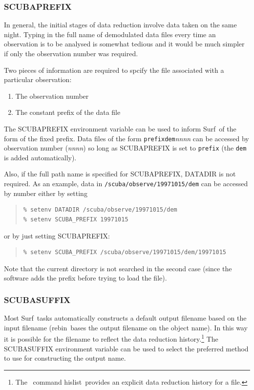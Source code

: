 \documentclass[twoside,11pt]{article}
\newcommand{\scusoft}          {{\sc Surf}}
\newcommand{\Kappa}{\xref{{\sc{Kappa}}}{sun95}{}}
\newcommand{\task}[1]{{\sf #1}}
\newcommand{\rebin}{\htmlref{\task{rebin}}{REBIN}}
\newcommand{\hislist}{\xref{\task{hislist}}{sun95}{HISLIST}}
\newenvironment{myquote}{\begin{quote}\begin{small}}{\end{small}\end{quote}}
\newcommand{\htmlref}[2]{#1}
\newcommand{\xref}[3]{#1}
\renewcommand{\_}{\texttt{\symbol{95}}}
\begin{document}
\subsubsection{SCUBA\_PREFIX}

In general, the initial stages of data reduction involve data taken on the
same night. Typing in the full name of demodulated data files every time an
observation is to be analysed is somewhat tedious and it would be much simpler 
if only the observation number was required.

Two pieces of information are required to spcify the file associated with a
particular observation:
\begin{enumerate}
\item The observation number
\item The constant prefix of the data file
\end{enumerate}

The SCUBA\_PREFIX environment variable can be used to inform \scusoft\
of the form of the fixed prefix. Data files of the form
\texttt{prefix\_dem\_}\textit{nnnn} can be accessed by observation number
(\textit{nnnn}) so long as SCUBA\_PREFIX is set to \texttt{prefix} (the
\texttt{\_dem\_} is added automatically).

Also, if the full path name is specified for SCUBA\_PREFIX, DATADIR is not
required. As an example, data in \texttt{/scuba/observe/19971015/dem}
can be accessed by number either by setting
\begin{myquote}
\begin{verbatim}
% setenv DATADIR /scuba/observe/19971015/dem
% setenv SCUBA_PREFIX 19971015
\end{verbatim}
\end{myquote}
or by just setting SCUBA\_PREFIX:
\begin{myquote}
\begin{verbatim}
% setenv SCUBA_PREFIX /scuba/observe/19971015/dem/19971015
\end{verbatim}
\end{myquote}
Note that the current directory is not searched in the second case (since the
software adds the prefix before trying to load the file).



\subsubsection{SCUBA\_SUFFIX}

Most \scusoft\ tasks automatically constructs a default output filename based
on the input filename (\rebin\ bases the output filename on the object name).
In this way it is possible for the filename to reflect the data reduction
history.\footnote{The \Kappa\ command \hislist\ provides an explicit data
reduction history for a file.}
The SCUBA\_SUFFIX environment variable can be used to select the preferred 
method to use for constructing the output name.
\end{document}
